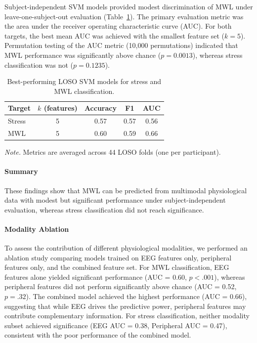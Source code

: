 \documentclass[lettersize,journal]{IEEEtran}
\begin{document}
Subject-independent SVM models provided modest discrimination of MWL under leave-one-subject-out evaluation (Table~\ref{tab:svm_results}). The primary evaluation metric was the area under the receiver operating characteristic curve (AUC). For both targets, the best mean AUC was achieved with the smallest feature set ($k=5$). Permutation testing of the AUC metric (10{,}000 permutations) indicated that MWL performance was significantly above chance ($p=0.0013$), whereas stress classification was not ($p=0.1235$).

\begin{table}[t]
\centering
\caption{Best-performing LOSO SVM models for stress and MWL classification.}
\label{tab:svm_results}
\begin{tabular}{lcccc}
\toprule
Target & $k$ (features) & Accuracy & F1 & AUC \\
\midrule
Stress & 5  & 0.57 & 0.57 & 0.56 \\
MWL    & 5  & 0.60 & 0.59 & 0.66 \\
\bottomrule
\end{tabular}
\end{table}

\noindent\textit{Note.} Metrics are averaged across 44 LOSO folds (one per participant).

\paragraph {Summary}
These findings show that MWL can be predicted from multimodal physiological data with modest but significant performance under subject-independent evaluation, whereas stress classification did not reach significance.

\paragraph{Modality Ablation}
To assess the contribution of different physiological modalities, we performed an ablation study comparing models trained on EEG features only, peripheral features only, and the combined feature set. For MWL classification, EEG features alone yielded significant performance (AUC = 0.60, $p < .001$), whereas peripheral features did not perform significantly above chance (AUC = 0.52, $p = .32$). The combined model achieved the highest performance (AUC = 0.66), suggesting that while EEG drives the predictive power, peripheral features may contribute complementary information. For stress classification, neither modality subset achieved significance (EEG AUC = 0.38, Peripheral AUC = 0.47), consistent with the poor performance of the combined model.
\end{document}
